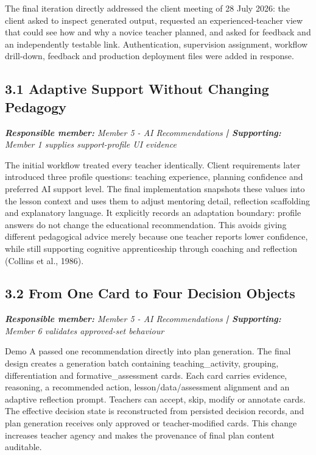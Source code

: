 \documentclass[11pt,a4paper]{article}
\begin{document}
The final iteration directly addressed the client meeting of 28 July 2026: the client asked to inspect generated output, requested an experienced-teacher view that could see how and why a novice teacher planned, and asked for feedback and an independently testable link. Authentication, supervision assignment, workflow drill-down, feedback and production deployment files were added in response.\par

\subsection*{3.1 Adaptive Support Without Changing Pedagogy}


\noindent\textit{\textbf{Responsible member: }Member 5 - AI Recommendations\textbf{ | Supporting: }Member 1 supplies support-profile UI evidence}\par

The initial workflow treated every teacher identically. Client requirements later introduced three profile questions: teaching experience, planning confidence and preferred AI support level. The final implementation snapshots these values into the lesson context and uses them to adjust mentoring detail, reflection scaffolding and explanatory language. It explicitly records an adaptation boundary: profile answers do not change the educational recommendation. This avoids giving different pedagogical advice merely because one teacher reports lower confidence, while still supporting cognitive apprenticeship through coaching and reflection (Collins et al., 1986).\par

\subsection*{3.2 From One Card to Four Decision Objects}


\noindent\textit{\textbf{Responsible member: }Member 5 - AI Recommendations\textbf{ | Supporting: }Member 6 validates approved-set behaviour}\par

Demo A passed one recommendation directly into plan generation. The final design creates a generation batch containing teaching\_activity, grouping, differentiation and formative\_assessment cards. Each card carries evidence, reasoning, a recommended action, lesson/data/assessment alignment and an adaptive reflection prompt. Teachers can accept, skip, modify or annotate cards. The effective decision state is reconstructed from persisted decision records, and plan generation receives only approved or teacher-modified cards. This change increases teacher agency and makes the provenance of final plan content auditable.\par
\end{document}
